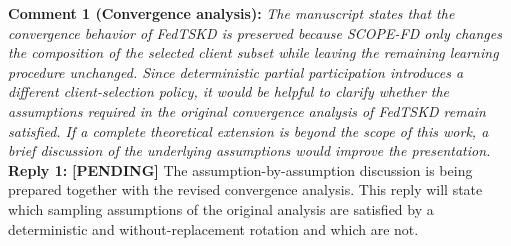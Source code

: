 \documentclass[10pt]{article}
\newcommand{\PENDING}[1]{{\color{red}\textbf{[PENDING] }#1}}
\begin{document}
\noindent
\textbf{Comment 1 (Convergence analysis):} \textit{The manuscript states that the convergence behavior of FedTSKD is preserved because SCOPE-FD only changes the composition of the selected client subset while leaving the remaining learning procedure unchanged. Since deterministic partial participation introduces a different client-selection policy, it would be helpful to clarify whether the assumptions required in the original convergence analysis of FedTSKD remain satisfied. If a complete theoretical extension is beyond the scope of this work, a brief discussion of the underlying assumptions would improve the presentation.} \\
\noindent
\textbf{Reply 1:} \PENDING{The assumption-by-assumption discussion is being prepared together with the revised convergence analysis. This reply will state which sampling assumptions of the original analysis are satisfied by a deterministic and without-replacement rotation and which are not.}\\
\end{document}
